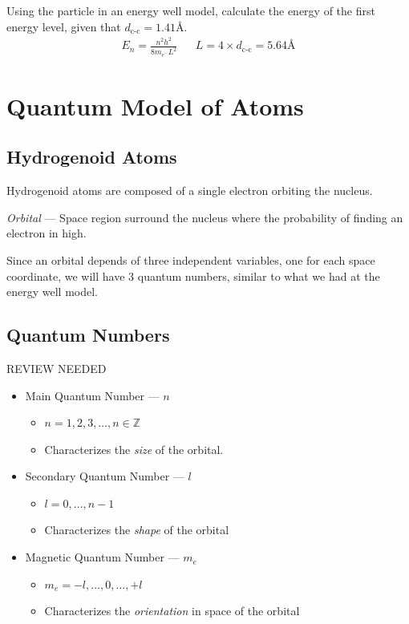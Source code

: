 \documentclass{article}[10pt]
\begin{document}
Using the particle in an energy well model, calculate the energy of the first energy
level, given that $d_{\text{c-c}}=1.41\si{\angstrom}$.
\begin{align*}
	E_n = \frac{n^2h^2}{8m_{e^{-}}L^2} &   & L=4\times d_{\text{c-c}}=5.64\si{\angstrom}
\end{align*}
\section{Quantum Model of Atoms}
\subsection{Hydrogenoid Atoms}
Hydrogenoid atoms are composed of a single electron orbiting the nucleus.

\emph{Orbital} --- Space region surround the nucleus where the probability of
finding an electron in high.

Since an orbital depends of three independent variables, one for each space
coordinate, we will have 3 quantum numbers, similar to what we had at the energy
well model.
\subsection{Quantum Numbers}
REVIEW NEEDED
\begin{itemize}
    \item Main Quantum Number --- $n$
    \begin{itemize}
        \item $n=1,2,3,\ldots,n\in\mathbb Z$
        \item Characterizes the \emph{size} of the orbital.
    \end{itemize}
    \item Secondary Quantum Number --- $l$
    \begin{itemize}
        \item $l=0,\ldots,n-1$\\
        \item Characterizes the \emph{shape} of the orbital
    \end{itemize}
    \item Magnetic Quantum Number --- $m_e$
    \begin{itemize}
        \item $m_e = -l,\ldots,0,\ldots,+l$
        \item Characterizes the \emph{orientation} in space of the orbital
    \end{itemize}
\end{itemize}
\end{document}
